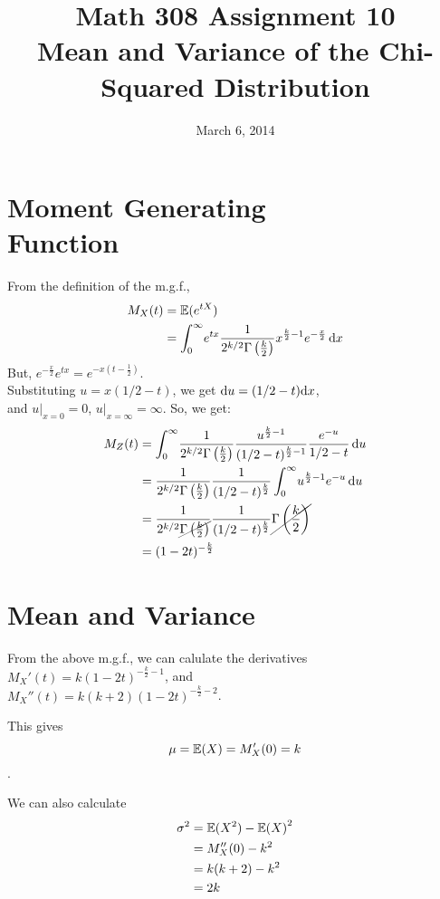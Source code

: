 \documentclass[twocolumn]{article}
\title{Math 308 Assignment 10\\Mean and Variance of the Chi-Squared Distribution}
\date{March 6, 2014}
\newcommand{\hk}{\frac{k}{2}}
\newcommand{\ga}{\Gamma\left(\hk\right)}
\begin{document}
\maketitle

\section{Moment Generating \\ Function}
From the definition of the m.g.f., \begin{align*}
M_X(t)&=\ev{e^{tX}}\\
&=\intg{0}{\infty}{
	e^{tx} \frac{1}{2^{k/2}\ga} x^{\hk-1} e^{-\frac{x}{2}}
}{x}\\
\end{align*}
But, $e^{-\frac{x}{2}}e^{tx}= e^{-x(t-\frac{1}{2})}$.\\
Substituting $u=x(1/2-t)$, we get $\mathrm{d} u= (1/2-t)\mathrm{d} x$,\\
and $u|_{x=0}=0$, $u|_{x=\infty}=\infty$.
So, we get:\begin{align*}
M_Z(t)
&=\intg{0}{\infty}{
	\frac{1}{2^{k/2} \ga} \frac{u^{\hk-1}}{(1/2-t)^{\hk-1}} \frac{e^{-u}}{1/2-t}
}{u}\\
&=\frac{1}{2^{k/2} \ga} \frac{1}{(1/2-t)^{\hk}} \intg{0}{\infty}{
	u^{\hk-1} e^{-u}
}{u}\\
&= \frac{1}{2^{k/2} \cancel{\ga}} \frac{1}{(1/2-t)^{\hk}} \cancel{\ga} \\
&= (1-2t)^{-\hk}
\end{align*}

\newpage

\section{Mean and Variance}

From the above m.g.f., we can calulate the derivatives\\
$M_X'(t)=k(1-2t)^{-\hk-1}$, and\\ $M_X''(t)=k(k+2)(1-2t)^{-\hk-2}$.

This gives \[\mu= \mathbb{E}(X)= M_X'(0)=k\].

We can also calculate\begin{align*}
\sigma^2&=\mathbb{E}(X^2)-{\mathbb{E}(X)}^2\\
&=M_X''(0)-k^2\\
&=k(k+2)-k^2\\
&=2k
\end{align*}
\end{document}
